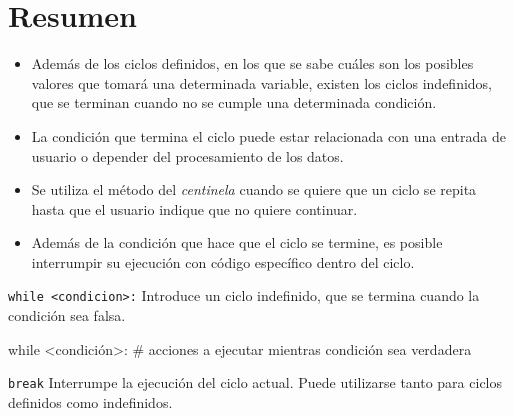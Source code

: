

\newpage
\section{Resumen}

\begin{itemize}

\item Además de los ciclos definidos, en los que se sabe cuáles son los
posibles valores que tomará una determinada variable, existen los ciclos
indefinidos, que se terminan cuando no se cumple una determinada condición.

\item La condición que termina el ciclo puede estar relacionada con una entrada
de usuario o depender del procesamiento de los datos.

\item Se utiliza el método del {\it centinela} cuando se quiere que un ciclo se
repita hasta que el usuario indique que no quiere continuar.

\item Además de la condición que hace que el ciclo se termine, es posible
interrumpir su ejecución con código específico dentro del ciclo.

\end{itemize}

\begin{referencia_python}

\begin{sintaxis}{\lstinline!while <condicion>:!}
Introduce un ciclo indefinido, que se termina cuando la condición sea falsa.
\begin{codigo-python-sn}
while <condición>:
    # acciones a ejecutar mientras condición sea verdadera
\end{codigo-python-sn}
\end{sintaxis}

\begin{sintaxis}{\lstinline!break!}
Interrumpe la ejecución del ciclo actual. Puede utilizarse tanto para ciclos
definidos como indefinidos.
\end{sintaxis}

\end{referencia_python}

